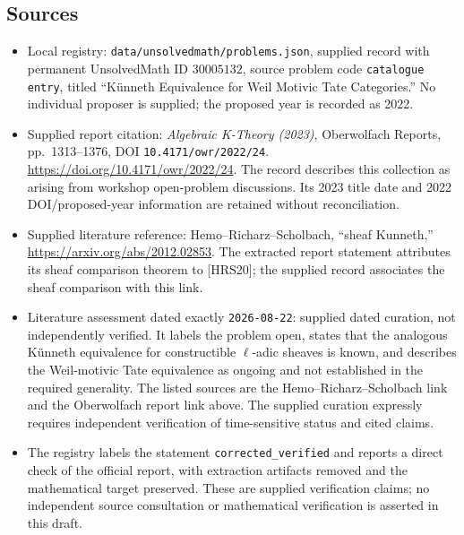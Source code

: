 \documentclass[11pt]{article}
\begin{document}
\subsection{Sources}
\begin{itemize}
\item Local registry: \texttt{data/unsolvedmath/problems.json}, supplied record with permanent UnsolvedMath ID \(30005132\), source problem code \texttt{catalogue entry}, titled ``K\"unneth Equivalence for Weil Motivic Tate Categories.'' No individual proposer is supplied; the proposed year is recorded as 2022.
\item Supplied report citation: \emph{Algebraic K-Theory (2023)}, Oberwolfach Reports, pp.~1313--1376, DOI \texttt{10.4171/owr/2022/24}. \url{https://doi.org/10.4171/owr/2022/24}. The record describes this collection as arising from workshop open-problem discussions. Its 2023 title date and 2022 DOI/proposed-year information are retained without reconciliation.
\item Supplied literature reference: Hemo--Richarz--Scholbach, ``sheaf Kunneth,'' \url{https://arxiv.org/abs/2012.02853}. The extracted report statement attributes its sheaf comparison theorem to [HRS20]; the supplied record associates the sheaf comparison with this link.
\item Literature assessment dated exactly \texttt{2026-08-22}: supplied dated curation, not independently verified. It labels the problem open, states that the analogous K\"unneth equivalence for constructible \(\ell\)-adic sheaves is known, and describes the Weil-motivic Tate equivalence as ongoing and not established in the required generality. The listed sources are the Hemo--Richarz--Scholbach link and the Oberwolfach report link above. The supplied curation expressly requires independent verification of time-sensitive status and cited claims.
\item The registry labels the statement \texttt{corrected\_verified} and reports a direct check of the official report, with extraction artifacts removed and the mathematical target preserved. These are supplied verification claims; no independent source consultation or mathematical verification is asserted in this draft.
\end{itemize}
\end{document}
